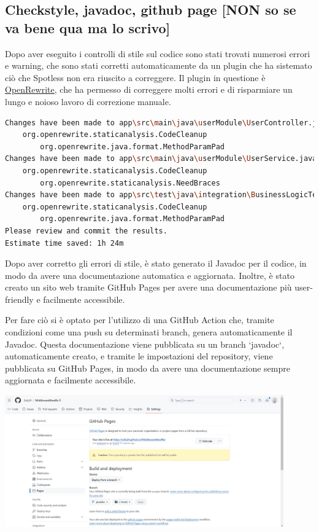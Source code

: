\subsection{Checkstyle, javadoc, github page [NON so se va bene qua ma lo scrivo] }

Dopo aver eseguito i controlli di stile sul codice sono stati trovati numerosi errori e warning, che sono stati corretti automaticamente da un plugin che ha sistemato ciò che Spotless non era riuscito a correggere. Il plugin in questione è \href{https://github.com/openrewrite/rewrite}{\underline{OpenRewrite}}, che ha permesso di correggere molti errori e di risparmiare un lungo e noioso lavoro di correzione manuale.

\begin{lstlisting}[language=Bash, caption={Output di OpenRewrite}, label=list:openrewrite]
Changes have been made to app\src\main\java\userModule\UserController.java by:
    org.openrewrite.staticanalysis.CodeCleanup
        org.openrewrite.java.format.MethodParamPad
Changes have been made to app\src\main\java\userModule\UserService.java by:
    org.openrewrite.staticanalysis.CodeCleanup
        org.openrewrite.staticanalysis.NeedBraces
Changes have been made to app\src\test\java\integration\BusinessLogicTestIntegration.java by:
    org.openrewrite.staticanalysis.CodeCleanup
        org.openrewrite.java.format.MethodParamPad
Please review and commit the results.
Estimate time saved: 1h 24m 
\end{lstlisting}

Dopo aver corretto gli errori di stile, è stato generato il Javadoc per il codice, in modo da avere una documentazione automatica e aggiornata. Inoltre, è stato creato un sito web tramite GitHub Pages per avere una documentazione più user-friendly e facilmente accessibile. 

Per fare ciò si è optato per l'utilizzo di una GitHub Action che, tramite condizioni come una push su determinati branch, genera automaticamente il Javadoc. Questa documentazione viene pubblicata su un branch `javadoc`, automaticamente creato, e tramite le impostazioni del repository, viene pubblicata su GitHub Pages, in modo da avere una documentazione sempre aggiornata e facilmente accessibile.

\includegraphics[width=12cm]{report/img/github_javadoc.jpg}\\[1.5cm]

